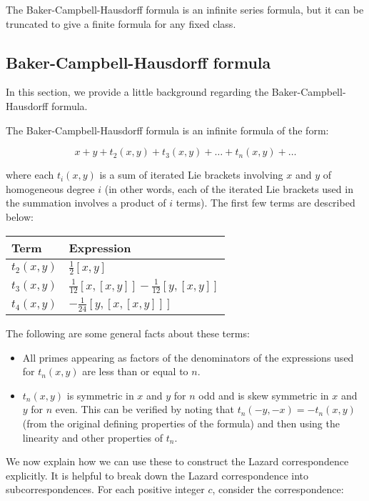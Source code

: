 The Baker-Campbell-Hausdorff formula is an infinite series formula,
but it can be truncated to give a finite formula for any fixed class.

\subsection{Baker-Campbell-Hausdorff formula}

In this section, we provide a little background regarding the
Baker-Campbell-Hausdorff formula.

The Baker-Campbell-Hausdorff formula is an infinite formula of the form:

$$x + y + t_2(x,y) + t_3(x,y) + \dots+ t_n(x,y) + \dots$$

where each $t_i(x,y)$ is a sum of iterated Lie brackets involving $x$
and $y$ of homogeneous degree $i$ (in other words, each of the
iterated Lie brackets used in the summation involves a product of $i$
terms). The first few terms are described below:

\begin{tabular}{|l|l|}
  \hline
  Term & Expression\\\hline
  $t_2(x,y)$ & $\frac{1}{2}[x,y]$ \\\hline
  $t_3(x,y)$ & $ \frac{1}{12}[x,[x,y]] - \frac{1}{12}[y,[x,y]]$ \\\hline
  $t_4(x,y)$ & $-\frac{1}{24}[y,[x,[x,y]]]$\\\hline
\end{tabular}

The following are some general facts about these terms:

\begin{itemize}
\item All primes appearing as factors of the denominators of the
  expressions used for $t_n(x,y)$ are less than or equal to $n$.
\item $t_n(x,y)$ is symmetric in $x$ and $y$ for $n$ odd and is skew
  symmetric in $x$ and $y$ for $n$ even. This can be verified by
  noting that $t_n(-y,-x) = -t_n(x,y)$ (from the original defining
  properties of the formula) and then using the linearity and other
  properties of $t_n$.
\end{itemize}

We now explain how we can use these to construct the Lazard
correspondence explicitly. It is helpful to break down the Lazard
correspondence into subcorrespondences. For each positive integer $c$,
consider the correspondence:

